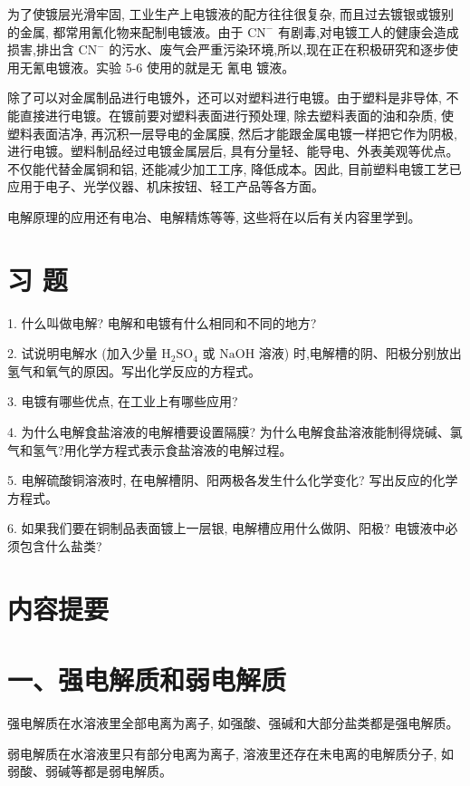 \documentclass[10pt]{article}
\begin{document}
为了使镀层光滑牢固, 工业生产上电镀液的配方往往很复杂, 而且过去镀银或镀别的金属, 都常用氰化物来配制电镀液。由于 \({\mathrm{{CN}}}^{ - }\) 有剧毒,对电镀工人的健康会造成损害,排出含 \({\mathrm{{CN}}}^{ - }\) 的污水、废气会严重污染环境,所以,现在正在积极研究和逐步使用无氰电镀液。实验 5-6 使用的就是无 氰电 镀液。

除了可以对金属制品进行电镀外，还可以对塑料进行电镀。由于塑料是非导体, 不能直接进行电镀。在镀前要对塑料表面进行预处理, 除去塑料表面的油和杂质, 使塑料表面洁净, 再沉积一层导电的金属膜, 然后才能跟金属电镀一样把它作为阴极, 进行电镀。塑料制品经过电镀金属层后, 具有分量轻、能导电、外表美观等优点。不仅能代替金属铜和铝, 还能减少加工工序, 降低成本。因此, 目前塑料电镀工艺已应用于电子、光学仪器、机床按钮、轻工产品等各方面。

电解原理的应用还有电冶、电解精炼等等, 这些将在以后有关内容里学到。

\section*{习 题}

1. 什么叫做电解? 电解和电镀有什么相同和不同的地方?

2. 试说明电解水 (加入少量 \({\mathrm{H}}_{2}{\mathrm{{SO}}}_{4}\) 或 \(\mathrm{{NaOH}}\) 溶液) 时,电解槽的阴、阳极分别放出氢气和氧气的原因。写出化学反应的方程式。

3. 电镀有哪些优点, 在工业上有哪些应用?

4. 为什么电解食盐溶液的电解槽要设置隔膜? 为什么电解食盐溶液能制得烧碱、氯气和氢气?用化学方程式表示食盐溶液的电解过程。

5. 电解硫酸铜溶液时, 在电解槽阴、阳两极各发生什么化学变化? 写出反应的化学方程式。

6. 如果我们要在铜制品表面镀上一层银, 电解槽应用什么做阴、阳极? 电镀液中必须包含什么盐类?

\section*{内容提要}

\section*{一、强电解质和弱电解质}

强电解质在水溶液里全部电离为离子, 如强酸、强碱和大部分盐类都是强电解质。

弱电解质在水溶液里只有部分电离为离子, 溶液里还存在未电离的电解质分子, 如弱酸、弱碱等都是弱电解质。
\end{document}
